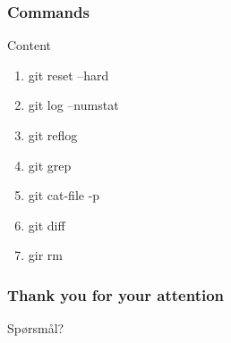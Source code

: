 \documentclass{beamer}
\begin{document}
    \begin{frame}
        \frametitle{Commands}

        \begin{block}{Content}
            \begin{enumerate}
                \item git reset --hard
                \item git log --numstat
                \item git reflog
                \item git grep
                \item git cat-file -p
                \item git diff
                \item gir rm
            \end{enumerate}
        \end{block}

    \end{frame}


    \begin{frame}
        \frametitle{Thank you for your attention}
        Spørsmål?
    \end{frame}
\end{document}
